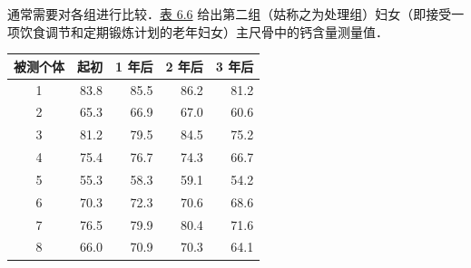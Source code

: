 通常需要对各组进行比较．\hyperref[tab:6.6]{表 6.6} 给出第二组（姑称之为处理组）妇女（即接受一项饮食调节和定期锻炼计划的老年妇女）主尺骨中的钙含量测量值．

\begin{mvtable}
\label{tab:6.6}
\begin{tabular}{crrrr}
\toprule
被测个体 & 起初 & 1 年后 & 2 年后 & 3 年后\\
\midrule
1 & 83.8 & 85.5 & 86.2 & 81.2\\
2 & 65.3 & 66.9 & 67.0 & 60.6\\
3 & 81.2 & 79.5 & 84.5 & 75.2\\
4 & 75.4 & 76.7 & 74.3 & 66.7\\
5 & 55.3 & 58.3 & 59.1 & 54.2\\
6 & 70.3 & 72.3 & 70.6 & 68.6\\
7 & 76.5 & 79.9 & 80.4 & 71.6\\
8 & 66.0 & 70.9 & 70.3 & 64.1\\
\bottomrule
\end{tabular}
\end{mvtable}
